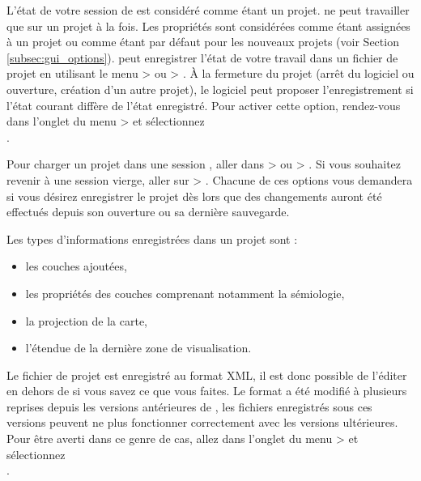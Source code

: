 L'état de votre session de \qg est considéré comme étant un projet. \qg ne peut travailler que sur un projet à la fois. Les propriétés sont considérées comme étant assignées à un projet ou comme étant par défaut pour les nouveaux projets (voir Section \ref{subsec:gui_options}). \qg peut enregistrer l'état de votre travail dans un fichier de projet en utilisant le menu  >  ou  > . À la fermeture du projet (arrêt du logiciel ou ouverture, création d'un autre projet), le logiciel peut proposer l'enregistrement si l'état courant diffère de l'état enregistré. Pour activer cette option, rendez-vous dans l'onglet  du menu  >  et sélectionnez\\
.


Pour charger un projet dans une session \qg, aller dans  >  ou  > . Si vous souhaitez revenir à une session vierge, aller sur  > .
Chacune de ces options vous demandera si vous désirez enregistrer le projet dès lors que des changements auront été effectués depuis son ouverture ou sa dernière sauvegarde.

Les types d'informations enregistrées dans un projet sont :

\begin{itemize}[label=--]
\item les couches ajoutées,
\item les propriétés des couches comprenant notamment la sémiologie,
\item la projection de la carte,
\item l'étendue de la dernière zone de visualisation.
\end{itemize}

Le fichier de projet est enregistré au format XML, il est donc possible de l'éditer en dehors de \qg si vous savez ce que vous faites. Le format a été modifié à plusieurs reprises depuis les versions antérieures de \qg, les fichiers enregistrés sous ces versions peuvent ne plus fonctionner correctement avec les versions ultérieures. Pour être averti dans ce genre de cas, allez dans l'onglet  du menu  >  et sélectionnez\\
.

